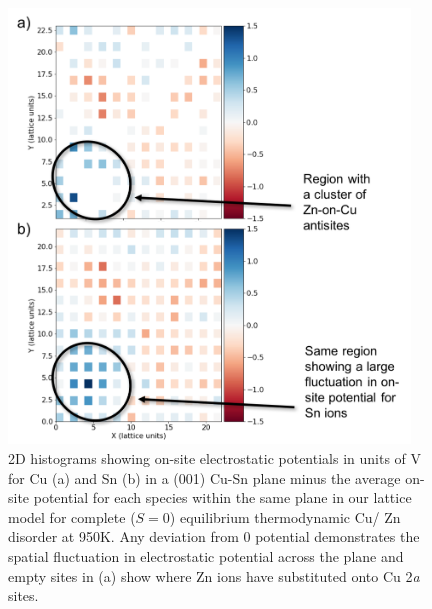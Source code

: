 \documentclass[11pt, twoside]{report}
\begin{document}

\begin{figure}[]
  \centering
    \includegraphics[width=0.95\textwidth]{figures/spatial_pot_Cu-Sn_950K_edit.png}
    \caption{2D histograms showing on-site electrostatic potentials in units of V for Cu (a) and Sn (b) in a (001) Cu-Sn plane minus the average on-site potential for each species within the same plane in our {\CZTS} lattice model for complete ($S=0$) equilibrium thermodynamic Cu/ Zn disorder at 950K. Any deviation from 0 potential demonstrates the spatial fluctuation in electrostatic potential across the plane and empty sites in (a) show where Zn ions have substituted onto Cu 2\textit{a} sites.}
  \label{spatial_pot_fluc_Cu-Sn}
\end{figure}
\end{document}
